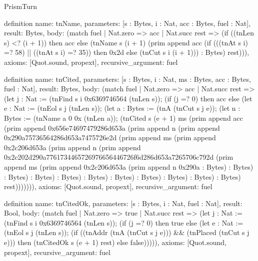 \begin{lexlean}{PrismTurn}
\begin{semanticmodule}
definition{
  name: tnName,
  parameters: [s : Bytes, i : Nat, acc : Bytes, fuel : Nat],
  result: Bytes,
  body: (match fuel
    | Nat.zero => acc
    | Nat.succ rest => (if ((tnLen s) <? (i + 1)) then acc else (tnName s (i + 1) (prim append acc (if (((tnAt s i) =? 58) || ((tnAt s i) =? 35)) then 0x2d else (tnCut s i (i + 1))) : Bytes) rest))),
  axioms: [Quot.sound, propext],
  recursive_argument: fuel
}

definition{
  name: tnCited,
  parameters: [s : Bytes, i : Nat, ms : Bytes, acc : Bytes, fuel : Nat],
  result: Bytes,
  body: (match fuel
    | Nat.zero => acc
    | Nat.succ rest => (let j : Nat := (tnFind s i 0x6369746564 (tnLen s)); (if (j =? 0) then acc else (let e : Nat := (tnEol s j (tnLen s)); (let a : Bytes := (tnA (tnCut s j e)); (let n : Bytes := (tnName a 0 0x (tnLen a)); (tnCited s (e + 1) ms (prim append acc (prim append 0x656e74697479286d653a (prim append n (prim append 0x290a75736564286d653a7475726e2d (prim append ms (prim append 0x2c206d653a (prim append n (prim append 0x2c202d290a7761734465726976656446726f6d286d653a7265706c792d (prim append ms (prim append 0x2c206d653a (prim append n 0x290a : Bytes) : Bytes) : Bytes) : Bytes) : Bytes) : Bytes) : Bytes) : Bytes) : Bytes) : Bytes) : Bytes) rest))))))),
  axioms: [Quot.sound, propext],
  recursive_argument: fuel
}

definition{
  name: tnCitedOk,
  parameters: [s : Bytes, i : Nat, fuel : Nat],
  result: Bool,
  body: (match fuel
    | Nat.zero => true
    | Nat.succ rest => (let j : Nat := (tnFind s i 0x6369746564 (tnLen s)); (if (j =? 0) then true else (let e : Nat := (tnEol s j (tnLen s)); (if ((tnAddr (tnA (tnCut s j e))) && (tnPlaced (tnCut s j e))) then (tnCitedOk s (e + 1) rest) else false))))),
  axioms: [Quot.sound, propext],
  recursive_argument: fuel
}


\end{semanticmodule}
\end{lexlean}
